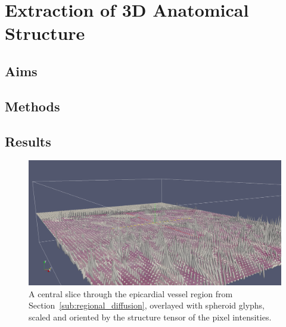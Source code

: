 \chapter{Extraction of 3D Anatomical Structure}
\dblspace

\section{Aims} %
\label{sec:aims}
  

\section{Methods} %
\label{sec:methods}
  

\section{Results} %
\label{sec:results}
  \begin{figure}
    \centering
    \includegraphics[width=\textwidth]{Ch8/Figs/structure_tensor_glyphs}
    \caption{A central slice through the epicardial vessel region from Section~\ref{sub:regional_diffusion}, overlayed with spheroid glyphs, scaled and oriented by the structure tensor of the pixel intensities.}
    \label{fig:structure_tensor_glyphs}
  \end{figure}
    
